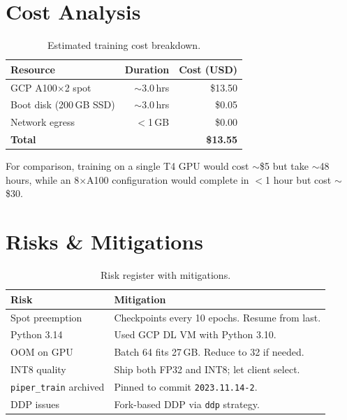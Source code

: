 \documentclass[10pt,a4paper,twocolumn]{article}
\begin{document}
\section{Cost Analysis}
\label{sec:cost}

\begin{table}[ht]
\centering
\begin{tabular}{@{}lrr@{}}
\toprule
\textbf{Resource} & \textbf{Duration} & \textbf{Cost (USD)} \\
\midrule
GCP A100$\times$2 spot & $\sim$3.0\,hrs & \$13.50 \\
Boot disk (200\,GB SSD) & $\sim$3.0\,hrs & \$0.05 \\
Network egress & $<$1\,GB & \$0.00 \\
\midrule
\textbf{Total} & & \textbf{\$13.55} \\
\bottomrule
\end{tabular}
\caption{Estimated training cost breakdown.}
\label{tab:cost}
\end{table}

For comparison, training on a single T4 GPU would cost $\sim$\$5 but take $\sim$48 hours, while an 8$\times$A100 configuration would complete in $<$1 hour but cost $\sim$\$30.

\section{Risks \& Mitigations}
\label{sec:risks}

\begin{table}[ht]
\centering
\scriptsize
\begin{tabular}{@{}p{2.2cm}p{3.8cm}@{}}
\toprule
\textbf{Risk} & \textbf{Mitigation} \\
\midrule
Spot preemption & Checkpoints every 10 epochs. Resume from last. \\
Python 3.14 & Used GCP DL VM with Python 3.10. \\
OOM on GPU & Batch 64 fits 27\,GB. Reduce to 32 if needed. \\
INT8 quality & Ship both FP32 and INT8; let client select. \\
\texttt{piper\_train} archived & Pinned to commit \texttt{2023.11.14-2}. \\
DDP issues & Fork-based DDP via \texttt{ddp} strategy. \\
\bottomrule
\end{tabular}
\caption{Risk register with mitigations.}
\label{tab:risks}
\end{table}
\end{document}
